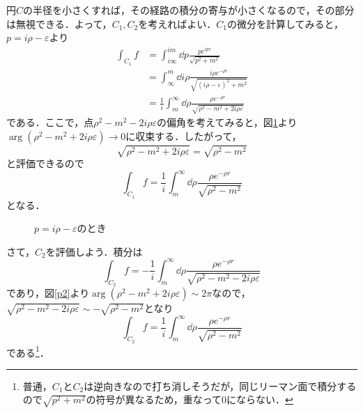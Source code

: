 \documentclass[a4paper,pdflatex,ja=standard]{bxjsarticle}
\begin{document}
円$C$の半径を小さくすれば，その経路の積分の寄与が小さくなるので，その部分は無視できる．よって，$C_{1},C_{2}$を考えればよい．$C_{1}$の微分を計算してみると，$p=i\rho-\varepsilon$より
\begin{align}
  \int_{C_{1}}f
  &=
  \int_{i\infty}^{im}
  \dd p
  \frac{pe^{ipr}}{\sqrt{p^2+m^2}}
  \nonumber
  \\
  &=  
  \int_{\infty}^{m}
  \dd i\rho
  \frac{i\rho e^{-\rho r}}{\sqrt{(i\rho-\varepsilon)^2+m^2}}
  \nonumber
  \\
  &=
  \frac{1}{i}
  \int_{m}^{\infty}
  \dd \rho
  \frac{\rho e^{-\rho r}}{\sqrt{\rho^2-m^2+2i\rho \varepsilon}}
  \label{f_c1}
\end{align}
である．ここで，点$\rho^2-m^2-2i\rho\varepsilon$の偏角を考えてみると，図\ref{p1}より$\arg(\rho^2-m^2+2i\rho\varepsilon)\rightarrow 0$に収束する．したがって，
\begin{equation}
  \sqrt{\rho^2-m^2+2i\rho \varepsilon}
  =
  \sqrt{\rho^2-m^2}
\end{equation}
と評価できるので
\begin{equation}
  \int_{C_1}f
  =
  \frac{1}{i}\int_{m}^{\infty}
  \dd \rho
  \frac{\rho e^{-\rho r}}{\sqrt{\rho^2-m^2}}
\end{equation}
となる．

\begin{figure}
  \centering
  \caption{$p=i\rho-\varepsilon$のとき}
  \label{p1}
\end{figure}

さて，$C_{2}$を評価しよう．積分は
\begin{equation}
  \int_{C_{2}}f
  =
  -\frac{1}{i}\int_{m}^{\infty}
  \dd \rho
  \frac{\rho e^{-\rho r}}{\sqrt{\rho^2-m^2-2i\rho\varepsilon}}
\end{equation}
であり，図\ref{p2}より$\arg(\rho^2-m^2+2i\rho\varepsilon)\sim 2\pi$なので，$\sqrt{\rho^2-m^2-2i\rho\varepsilon}\sim-\sqrt{\rho^2-m^2}$となり
\begin{equation}
  \int_{C_{2}}f
  =
  \frac{1}{i}\int_{m}^{\infty}
  \dd \rho
  \frac{\rho e^{-\rho r}}{\sqrt{\rho^2-m^2}}
\end{equation}
である\footnote{
  普通，$C_{1}$と$C_{2}$は逆向きなので打ち消しそうだが，同じリーマン面で積分するので$\sqrt{p^2+m^2}$の符号が異なるため，重なって$0$にならない．
}．
\end{document}
